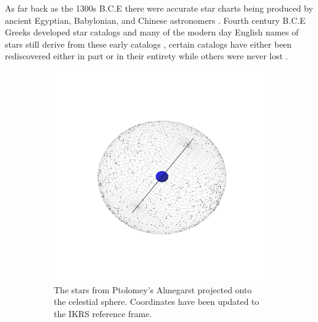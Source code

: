 As far back as the 1300s B.C.E there were accurate star charts being produced
by ancient Egyptian, Babylonian, and Chinese astronomers \citep{Lull2009,
Bonnet2009, Qiu2009, Gullberg2016, Yena2021}. Fourth century B.C.E Greeks
developed star catalogs and many of the modern day English names of stars still
derive from these early catalogs \citep{Hannah2021}, certain catalogs have
either been rediscovered either in part or in their entirety while others were
never 
lost \citep[Figure \ref{fig:starsInHistory}, ][]{Ptolemy150, Manitius1995} .

\begin{figure}[htbp]
  \centering
  \begin{subfigure}[t]{0.3\textwidth}
      \centering
      \includegraphics[width=\textwidth]{figures/introduction/Ptolomey.pdf}
      \caption{The stars from Ptolomey's Almegarst projected onto the celestial
      sphere. Coordinates have been updated to the IKRS reference frame.}
      \label{fig:ptolemy}
  \end{subfigure}
  \begin{subfigure}[t]{0.3\textwidth}
      \centering

\end{subfigure}
\end{figure}

